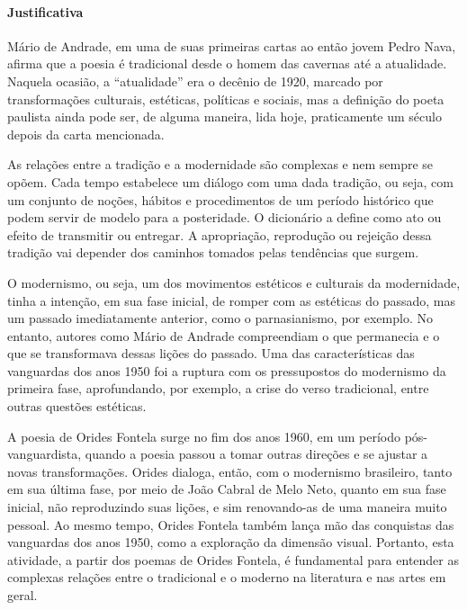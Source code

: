 \documentclass[12pt]{extarticle}
\begin{document}
\paragraph{Justificativa} Mário de Andrade, em uma de suas primeiras
cartas ao então jovem Pedro Nava, afirma que a poesia é tradicional
desde o homem das cavernas até a atualidade. Naquela ocasião, a
``atualidade'' era o decênio de 1920, marcado por transformações
culturais, estéticas, políticas e sociais, mas a definição do poeta
paulista ainda pode ser, de alguma maneira, lida hoje, praticamente um
século depois da carta mencionada.

As relações entre a tradição e a modernidade são complexas e nem sempre
se opõem. Cada tempo estabelece um diálogo com uma dada tradição, ou
seja, com um conjunto de noções, hábitos e procedimentos de um período
histórico que podem servir de modelo para a posteridade. O dicionário a
define como ato ou efeito de transmitir ou entregar. A apropriação,
reprodução ou rejeição dessa tradição vai depender dos caminhos tomados
pelas tendências que surgem.

O modernismo, ou seja, um dos movimentos estéticos e culturais da
modernidade, tinha a intenção, em sua fase inicial, de romper com as
estéticas do passado, mas um passado imediatamente anterior, como o
parnasianismo, por exemplo. No entanto, autores como Mário de Andrade
compreendiam o que permanecia e o que se transformava dessas lições do
passado. Uma das características das vanguardas dos anos 1950 foi a
ruptura com os pressupostos do modernismo da primeira fase,
aprofundando, por exemplo, a crise do verso tradicional, entre outras
questões estéticas.

A poesia de Orides Fontela surge no fim dos anos 1960, em um período
pós-vanguardista, quando a poesia passou a tomar outras direções e se
ajustar a novas transformações. Orides dialoga, então, com o modernismo
brasileiro, tanto em sua última fase, por meio de João Cabral de Melo
Neto, quanto em sua fase inicial, não reproduzindo suas lições, e sim
renovando-as de uma maneira muito pessoal. Ao mesmo tempo, Orides
Fontela também lança mão das conquistas das vanguardas dos anos 1950,
como a exploração da dimensão visual. Portanto, esta atividade, a partir
dos poemas de Orides Fontela, é fundamental para entender as complexas
relações entre o tradicional e o moderno na literatura e nas artes em
geral.
\end{document}
